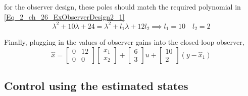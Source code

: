 for the observer design, these poles should match the required polynomial in \eqref{Eq_2_ch_26_ExObserverDesign2_1}
\begin{equation}
	\lambda^{2} + 10 \lambda + 24 = \lambda^2 + l_1 \lambda + 12 l_2 \implies l_1 = 10 \quad l_2 = 2
\end{equation}

Finally, plugging in the values of observer gains into the closed-loop observer,
\begin{equation}
	\dot{\hat{x}} = \begin{bmatrix}
	0 & 12 \\ 0 & 0
	\end{bmatrix}\begin{bmatrix}
	{x}_{1} \\ {x}_{2}
	\end{bmatrix} + \begin{bmatrix}
	6 \\ 3
	\end{bmatrix}u + \begin{bmatrix}
	10 \\ 2
	\end{bmatrix}(y - \hat{x}_{1})
\end{equation}

\subsection{Control using the estimated states}

